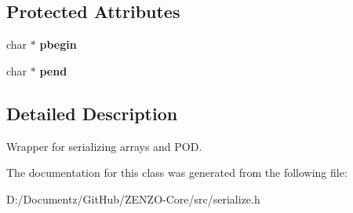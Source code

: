 \subsection*{Protected Attributes}
\begin{DoxyCompactItemize}
\item 
\mbox{\label{class_c_flat_data_ad5f93a9d4e1cc71eb5fc94e9c9d4d89d}} 
char $\ast$ {\bfseries pbegin}
\item 
\mbox{\label{class_c_flat_data_add53aa6440254a30392bcf660f3f8057}} 
char $\ast$ {\bfseries pend}
\end{DoxyCompactItemize}


\subsection{Detailed Description}
Wrapper for serializing arrays and P\+OD. 

The documentation for this class was generated from the following file\+:\begin{DoxyCompactItemize}
\item 
D\+:/\+Documentz/\+Git\+Hub/\+Z\+E\+N\+Z\+O-\/\+Core/src/serialize.\+h\end{DoxyCompactItemize}
